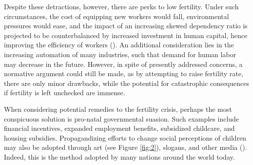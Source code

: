 \documentclass[12pt, a4paper, twoside]{article}
\begin{document}
Despite these detractions, however, there are perks to low fertility. Under such circumstances, the cost of equipping new workers would fall, environmental pressures would ease, and the impact of an increasing skewed dependency ratio is projected to be counterbalanced by increased investment in human capital, hence improving the efficiency of workers (\cites[p.\ 3]{jarzebski2021ageing}{lee2010fertility}[p.\ 7]{lee2014low}). An additional consideration lies in the increasing automation of many industries, such that demand for human labor may decrease in the future. However, in spite of presently addressed concerns, a normative argument could still be made, as by attempting to raise fertility rate, there are only minor drawbacks, while the potential for catastrophic consequences if fertility is left unchecked are immense. 

When considering potential remedies to the fertility crisis, perhaps the most conspicuous solution is pro-natal governmental suasion. Such examples include financial incentives, expanded employment benefits, subsidized childcare, and housing subsidies. Propagandizing efforts to change social perceptions of children may also be adopted through art (see Figure \ref{fig:2}), slogans, and other media (\cite[p.\ 37]{kohler2006low}). Indeed, this is the method adopted by many nations around the world today.
\end{document}

